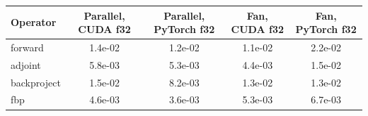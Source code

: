 \begin{tabular}{lcccc}
\toprule
Operator & Parallel, CUDA f32 & Parallel, PyTorch f32 & Fan, CUDA f32 & Fan, PyTorch f32 \\
\midrule
forward & 1.4e-02 & 1.2e-02 & 1.1e-02 & 2.2e-02 \\
adjoint & 5.8e-03 & 5.3e-03 & 4.4e-03 & 1.5e-02 \\
backproject & 1.5e-02 & 8.2e-03 & 1.3e-02 & 1.3e-02 \\
fbp & 4.6e-03 & 3.6e-03 & 5.3e-03 & 6.7e-03 \\
\bottomrule
\end{tabular}